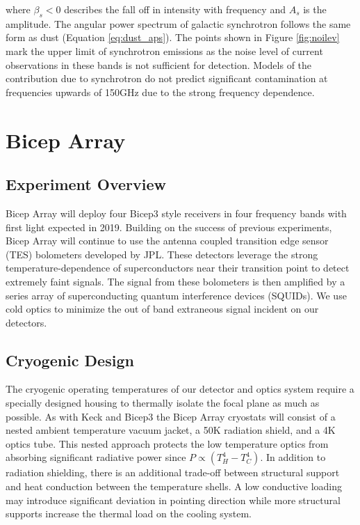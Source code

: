 \documentclass[12pt]{article}
\begin{document}
where $\beta _s < 0$ describes the fall off in intensity with frequency and
$A_s$ is the amplitude. The angular power spectrum of galactic synchrotron
follows the same form as dust (Equation \ref{eq:dust_aps}). The points shown
in Figure \ref{fig:noilev} mark the upper limit of synchrotron emissions as
the noise level of current observations in these bands is not sufficient for
detection. Models of the contribution due to synchrotron do not predict
significant contamination at frequencies upwards of 150GHz due to the strong
frequency dependence.


\section{Bicep Array}

\subsection{Experiment Overview}
Bicep Array will deploy four Bicep3 style receivers in four frequency bands
with first light expected in 2019. Building on the success of previous
experiments, Bicep Array will continue to use the antenna coupled transition
edge sensor (TES) bolometers developed by JPL. These detectors leverage the strong
temperature-dependence of superconductors near their transition point to
detect extremely faint signals. The signal from these bolometers is then
amplified by a series array of superconducting quantum interference devices
(SQUIDs). We use cold optics to minimize the out of band extraneous signal
incident on our detectors.

\subsection{Cryogenic Design}
The cryogenic operating temperatures of our detector and optics system require
a specially designed housing to thermally isolate the focal plane as much as
possible. As with Keck and Bicep3 the Bicep Array cryostats will consist of a
nested ambient temperature vacuum jacket, a 50K radiation shield, and a 4K
optics tube. This nested approach protects the low temperature optics
from absorbing significant radiative power since $P\propto (T_{H}^4-T_{C}^4)$.
In addition to radiation shielding, there is an additional trade-off between
structural support and heat conduction between the temperature shells. A low
conductive loading may introduce significant deviation in pointing direction
while more structural supports increase the thermal load on the cooling
system. 


\printbibliography
\end{document}
